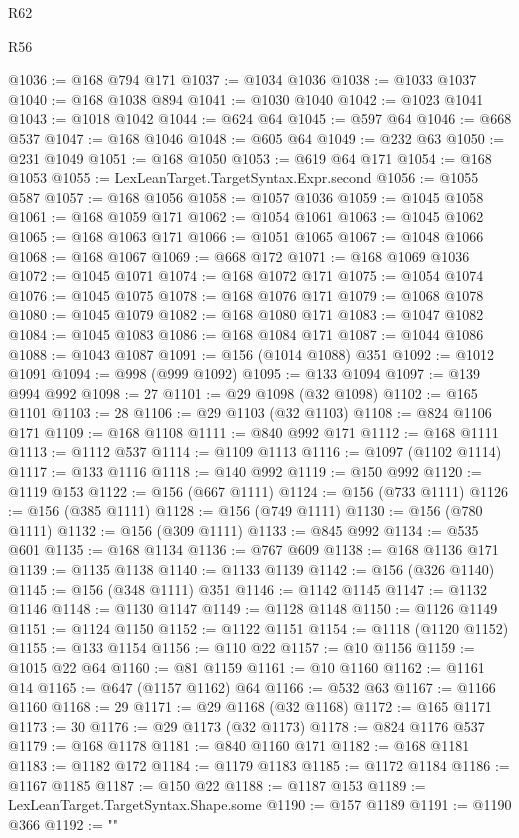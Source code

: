 \begin{lexlean}{R62}
\begin{lexlean}{R56}
\begin{coremodule}
{{{{{{{{{{{{{{{{{{{{{{{{{{{{{{{{{{{{{{{{{{{{{{{{{{{{{{{{{{{{{{{{{{{{{{{{{{{{{{{{{{{{{{{{{{{{{{{{{{{{{{{{{{{{{{{{{{{{{{{{{{{{{{{{{{{{{{{{{{{{{{{{{{{{{{{{{{{{{{{{{{{{{{{{{{{{{{{{{{{{{{{{{{{{{{{{{{{{{{{{{{{{{{{{{{{@1036 := @168 @794 @171
@1037 := @1034 @1036
@1038 := @1033 @1037
@1040 := @168 @1038 @894
@1041 := @1030 @1040
@1042 := @1023 @1041
@1043 := @1018 @1042
@1044 := @624 @64
@1045 := @597 @64
@1046 := @668 @537
@1047 := @168 @1046
@1048 := @605 @64
@1049 := @232 @63
@1050 := @231 @1049
@1051 := @168 @1050
@1053 := @619 @64 @171
@1054 := @168 @1053
@1055 := LexLeanTarget.TargetSyntax.Expr.second
@1056 := @1055 @587
@1057 := @168 @1056
@1058 := @1057 @1036
@1059 := @1045 @1058
@1061 := @168 @1059 @171
@1062 := @1054 @1061
@1063 := @1045 @1062
@1065 := @168 @1063 @171
@1066 := @1051 @1065
@1067 := @1048 @1066
@1068 := @168 @1067
@1069 := @668 @172
@1071 := @168 @1069 @1036
@1072 := @1045 @1071
@1074 := @168 @1072 @171
@1075 := @1054 @1074
@1076 := @1045 @1075
@1078 := @168 @1076 @171
@1079 := @1068 @1078
@1080 := @1045 @1079
@1082 := @168 @1080 @171
@1083 := @1047 @1082
@1084 := @1045 @1083
@1086 := @168 @1084 @171
@1087 := @1044 @1086
@1088 := @1043 @1087
@1091 := @156 (@1014 @1088) @351
@1092 := @1012 @1091
@1094 := @998 (@999 @1092)
@1095 := @133 @1094
@1097 := @139 @994 @992
@1098 := 27
@1101 := @29 @1098 (@32 @1098)
@1102 := @165 @1101
@1103 := 28
@1106 := @29 @1103 (@32 @1103)
@1108 := @824 @1106 @171
@1109 := @168 @1108
@1111 := @840 @992 @171
@1112 := @168 @1111
@1113 := @1112 @537
@1114 := @1109 @1113
@1116 := @1097 (@1102 @1114)
@1117 := @133 @1116
@1118 := @140 @992
@1119 := @150 @992
@1120 := @1119 @153
@1122 := @156 (@667 @1111)
@1124 := @156 (@733 @1111)
@1126 := @156 (@385 @1111)
@1128 := @156 (@749 @1111)
@1130 := @156 (@780 @1111)
@1132 := @156 (@309 @1111)
@1133 := @845 @992
@1134 := @535 @601
@1135 := @168 @1134
@1136 := @767 @609
@1138 := @168 @1136 @171
@1139 := @1135 @1138
@1140 := @1133 @1139
@1142 := @156 (@326 @1140)
@1145 := @156 (@348 @1111) @351
@1146 := @1142 @1145
@1147 := @1132 @1146
@1148 := @1130 @1147
@1149 := @1128 @1148
@1150 := @1126 @1149
@1151 := @1124 @1150
@1152 := @1122 @1151
@1154 := @1118 (@1120 @1152)
@1155 := @133 @1154
@1156 := @110 @22
@1157 := @10 @1156
@1159 := @1015 @22 @64
@1160 := @81 @1159
@1161 := @10 @1160
@1162 := @1161 @14
@1165 := @647 (@1157 @1162) @64
@1166 := @532 @63
@1167 := @1166 @1160
@1168 := 29
@1171 := @29 @1168 (@32 @1168)
@1172 := @165 @1171
@1173 := 30
@1176 := @29 @1173 (@32 @1173)
@1178 := @824 @1176 @537
@1179 := @168 @1178
@1181 := @840 @1160 @171
@1182 := @168 @1181
@1183 := @1182 @172
@1184 := @1179 @1183
@1185 := @1172 @1184
@1186 := @1167 @1185
@1187 := @150 @22
@1188 := @1187 @153
@1189 := LexLeanTarget.TargetSyntax.Shape.some
@1190 := @157 @1189
@1191 := @1190 @366
@1192 := "{"
}}}}}}}}}}}}}}}}}}}}}}}}}}}}}}}}}}}}}}}}}}}}}}}}}}}}}}}}}}}}}}}}}}}}}}}}}}}}}}}}}}}}}}}}}}}}}}}}}}}}}}}}}}}}}}}}}}}}}}}}}}}}}}}}}}}}}}}}}}}}}}}}}}}}}}}}}}}}}}}}}}}}}}}}}}}}}}}}}}}}}}}}}}}}}}}}}}}}}}}}}}}}}}}}}}}}
\end{coremodule}
\end{lexlean}
\end{lexlean}
